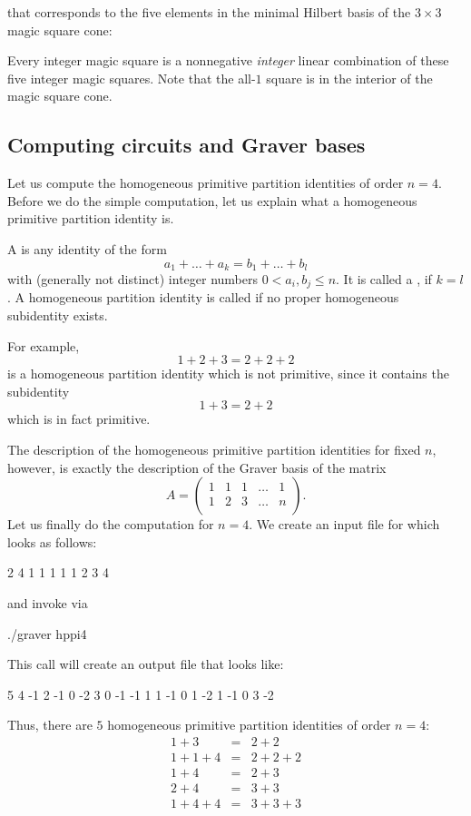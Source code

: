 that corresponds to the five elements in the minimal Hilbert basis of
the $3\times 3$ magic square cone: 
\vspace{-0.3cm}
\begin{center}
  
\end{center}
\vspace{-0.4cm}
Every integer magic square is a nonnegative \emph{integer} linear
combination of these five integer magic squares. Note that the all-$1$
square is in the interior of the magic square cone.



\subsection{Computing circuits and Graver bases}
Let us compute the homogeneous primitive partition identities of order
$n=4$. Before we do the simple computation, let us explain what a
homogeneous primitive partition identity is.

A  is any identity of the form
\[
a_1+\ldots+a_k=b_1+\ldots+b_l
\]
with (generally not distinct) integer numbers $0<a_i,b_j\leq n$. It is
called a , if $k=l$. A homogeneous
partition identity is called  if no proper homogeneous
subidentity exists.

For example,
\[
1+2+3=2+2+2
\]
is a homogeneous partition identity which is not primitive, since it
contains the subidentity
\[
1+3=2+2
\]
which is in fact primitive.

The description of the homogeneous primitive partition identities for
fixed $n$, however, is exactly the description of the Graver basis of
the matrix
\[
A=
\left(
\begin{array}{ccccc}
 1 & 1 & 1 & \ldots & 1 \\
 1 & 2 & 3 & \ldots & n \\
\end{array}
\right).
\]
Let us finally do the computation for $n=4$. We create an input file
 for \FourTiTwo{} which looks as follows:
\begin{myverbatim}
2 4
1 1 1 1
1 2 3 4
\end{myverbatim}
and invoke \FourTiTwo{} via
\begin{myverbatim}
./graver hppi4
\end{myverbatim}
This call will create an output file  that looks
like:
\begin{myverbatim}
5 4
-1 2 -1  0
-2 3  0 -1
-1 1  1 -1
 0 1 -2  1
-1 0  3 -2
\end{myverbatim}
Thus, there are $5$ homogeneous primitive partition identities of
order $n=4$:
\begin{eqnarray*}
1+3   & = & 2+2\\
1+1+4 & = & 2+2+2\\
1+4   & = & 2+3\\
2+4   & = & 3+3\\
1+4+4 & = & 3+3+3
\end{eqnarray*}
